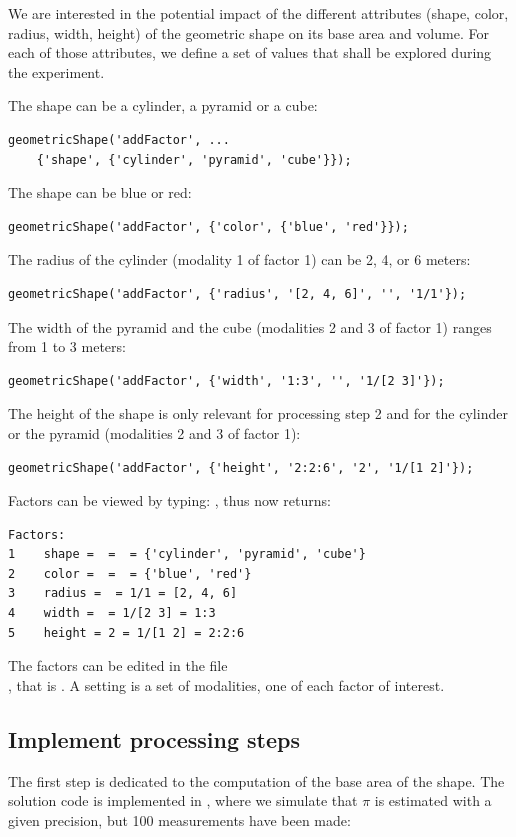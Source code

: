 \documentclass[a4paper,fleqn]{tufte-handout}
\begin{document}
We are interested in the potential impact of the different attributes (shape, color, radius, width, height) of the geometric shape on its base area and volume. For each of those attributes, we define a set of values that shall be explored during the experiment.

The shape can be a cylinder, a pyramid or a cube:
\begin{lstlisting}
geometricShape('addFactor', ...
	{'shape', {'cylinder', 'pyramid', 'cube'}});
\end{lstlisting}
The shape can be blue or red:
\begin{lstlisting}
geometricShape('addFactor', {'color', {'blue', 'red'}});
\end{lstlisting}
The radius of the cylinder (modality 1 of factor 1) can be 2, 4, or 6 meters:
\begin{lstlisting}
geometricShape('addFactor', {'radius', '[2, 4, 6]', '', '1/1'});
\end{lstlisting}
The width of the pyramid and the cube (modalities 2 and 3 of factor 1) ranges from 1 to 3 meters:
\begin{lstlisting}
geometricShape('addFactor', {'width', '1:3', '', '1/[2 3]'});
\end{lstlisting}
The height of the shape is only relevant for processing step 2 and for the cylinder or the pyramid (modalities 2 and 3 of factor 1):
\begin{lstlisting}
geometricShape('addFactor', {'height', '2:2:6', '2', '1/[1 2]'});
\end{lstlisting}


Factors can be viewed by typing: , thus  now returns:
\begin{lstlisting}
Factors:
1    shape =  =  = {'cylinder', 'pyramid', 'cube'}
2    color =  =  = {'blue', 'red'}
3    radius =  = 1/1 = [2, 4, 6]
4    width =  = 1/[2 3] = 1:3
5    height = 2 = 1/[1 2] = 2:2:6
\end{lstlisting}
The factors can be edited in the file \\ , that is . A setting is a set of modalities, one of each factor of interest.

\subsection{Implement processing steps}

The first step is dedicated to the computation of the base area of the shape. The solution code is implemented in , where we simulate that $\pi$ is estimated with a given precision, but 100 measurements have been made:

\end{document}
